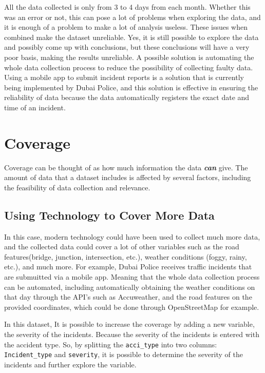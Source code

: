 \documentclass[
]{book}
\begin{document}
All the data collected is only from 3 to 4 days from each month. Whether this was an error or not, this can pose a lot of problems when exploring the data, and it is enough of a problem to make a lot of analysis useless. These issues when combined make the dataset unreliable. Yes, it is still possible to explore the data and possibly come up with conclusions, but these conclusions will have a very poor basis, making the results unreliable. A possible solution is automating the whole data collection process to reduce the possibility of collecting faulty data. Using a mobile app to submit incident reports is a solution that is currently being implemented by Dubai Police, and this solution is effective in ensuring the reliability of data because the data automatically registers the exact date and time of an incident.

\hypertarget{coverage}{%
\section{Coverage}\label{coverage}}

Coverage can be thought of as how much information the data \textbf{\emph{can}} give. The amount of data that a dataset includes is affected by several factors, including the feasibility of data collection and relevance.

\hypertarget{using-technology-to-cover-more-data}{%
\subsection{Using Technology to Cover More Data}\label{using-technology-to-cover-more-data}}

In this case, modern technology could have been used to collect much more data, and the collected data could cover a lot of other variables such as the road features(bridge, junction, intersection, etc.), weather conditions (foggy, rainy, etc.), and much more. For example, Dubai Police receives traffic incidents that are submuitted via a mobile app. Meaning that the whole data collection process can be automated, including automatically obtaining the weather conditions on that day through the API's such as Accuweather, and the road features on the provided coordinates, which could be done through OpenStreetMap for example.

In this dataset, It is possible to increase the coverage by adding a new variable, the severity of the incidents. Because the severity of the incidents is entered with the accident type. So, by splitting the \texttt{acci\_type} into two columns: \texttt{Incident\_type} and \texttt{severity}, it is possible to determine the severity of the incidents and further explore the variable.
\end{document}
